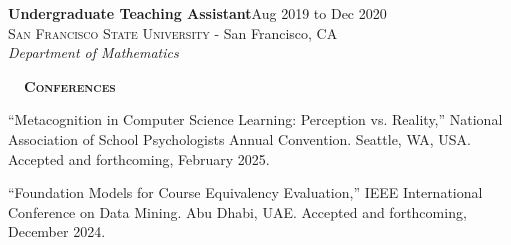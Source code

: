 \documentclass[hidelinks, 10.5pt]{article}
\def\contentwidth{0.9\linewidth}    %
\def\contentblockspacing{2.5mm}     %
\def\sectionspacing{8mm}            %
\def\sectiontocontentspacing{4mm}   %
\renewcommand{\section}[1]{
    {\fontsize{14}{14}\selectfont \textsc{\textbf{\ \ #1\ \ }}}\hrulefill
}
\begin{document}
{\vspace{\contentblockspacing}

\begin{minipage}[ct]{\contentwidth}
    \textbf{Undergraduate Teaching Assistant}\hfill Aug 2019 to Dec 2020\\
    {\textsc{San Francisco State University} - San Francisco, CA}\\
    \textit{Department of Mathematics}
\end{minipage}

\vspace{\sectionspacing}


\section{Conferences}

\vspace{\sectiontocontentspacing}

\begin{minipage}[ct]{\contentwidth}
    ``Metacognition in Computer Science Learning: Perception vs. Reality,'' National Association of School Psychologists Annual Convention.
    Seattle, WA, USA. Accepted and forthcoming, February 2025.
\end{minipage}

\vspace{\contentblockspacing}

\begin{minipage}[ct]{\contentwidth}
    ``Foundation Models for Course Equivalency Evaluation,'' IEEE International Conference on Data Mining.  Abu Dhabi, UAE.  Accepted and
    forthcoming, December 2024.
\end{minipage}

\vspace{\sectionspacing}





}
\end{document}
